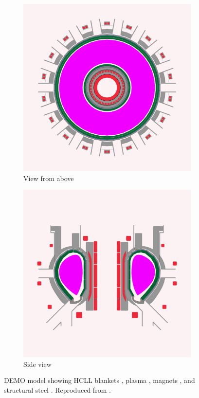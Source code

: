 \begin{figure}
    \centering
    \begin{subfigure}{0.45\linewidth}
        \includegraphics{Figures/Chapter1/blanket_shimwell_top_view.png}
        \caption{View from above}
    \end{subfigure}%
    \qquad
    \begin{subfigure}{0.45\linewidth}
        \includegraphics{Figures/Chapter1/blanket_shimwell_side_view.png}
        \caption{Side view}
    \end{subfigure}
    \caption{DEMO model showing HCLL blankets \cruleme[lithiumgreen]{0.3cm}{0.3cm}, plasma \cruleme[plasmapink]{0.3cm}{0.3cm}, magnets \cruleme[magnetred]{0.3cm}{0.3cm}, and structural steel \cruleme[steelgray]{0.3cm}{0.3cm}. Reproduced from \cite{shimwell_multiphysics_2019}.}
\end{figure}

